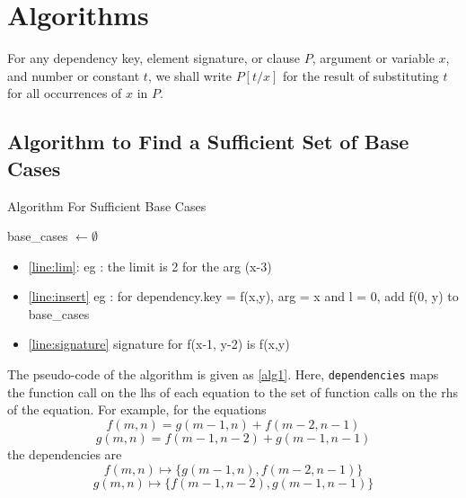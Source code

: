 \documentclass{article}
\begin{document}
\section{Algorithms}

For any dependency key, element signature, or clause $P$, argument or variable
$x$, and number or constant $t$, we shall write $P[t / x]$ for the result of
substituting $t$ for all occurrences of $x$ in $P$.

\subsection{Algorithm to Find a Sufficient Set of Base Cases}

\begin{algorithm}[t]
  \caption{Algorithm For Sufficient Base Cases}\label{alg1}

  base\_cases $\gets \emptyset$\;
\end{algorithm}

\begin{itemize}
  \item \cref{line:lim}: eg : the limit is 2 for the arg (x-3)
  \item \cref{line:insert} eg : for dependency.key = f(x,y), arg = x and l = 0,
        add f(0, y) to base\_cases
  \item \cref{line:signature} signature for f(x-1, y-2) is f(x,y)
\end{itemize}

The pseudo-code of the algorithm is given as \cref{alg1}. Here,
\texttt{dependencies} maps the function call on the lhs of each equation to the
set of function calls on the rhs of the equation. For example, for the equations
\begin{equation*}
  f(m, n) = g(m-1, n) + f(m-2, n-1)
\end{equation*}
\begin{equation*}
  g(m, n) = f(m-1, n-2) + g(m-1, n-1)
\end{equation*}
the dependencies are
\begin{equation*}
  f(m,n) \mapsto \{g(m-1,n), f(m-2, n-1)\}
\end{equation*}
\begin{equation*}
  g(m, n) \mapsto \{f(m-1, n-2), g(m-1, n-1)\}
\end{equation*}
\end{document}
